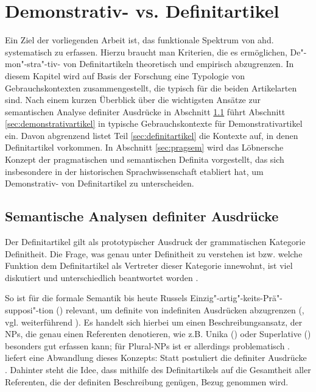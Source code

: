 \chapter{Demonstrativ- vs. Definitartikel}\label{chap:demdef}

Ein Ziel der vorliegenden Arbeit ist, das funktionale Spektrum von ahd.  systematisch zu erfassen. Hierzu braucht man Kriterien, die es ermöglichen, De"-mon"-stra"-tiv- von Definitartikeln theoretisch und empirisch  abzugrenzen. In diesem Kapitel wird auf Basis der Forschung eine Typologie von Gebrauchskontexten zusammengestellt, die typisch für die beiden Artikelarten sind. Nach einem kurzen Überblick über die wichtigsten Ansätze zur semantischen Analyse definiter Ausdrücke in Abschnitt \ref{sec:definitheitstheorien} führt Abschnitt \ref{sec:demonstrativartikel} in typische Gebrauchskontexte für Demonstrativartikel ein. Davon abgrenzend listet Teil \ref{sec:definitartikel} die Kontexte auf, in denen Definitartikel vorkommen. In Abschnitt \ref{sec:pragsem} wird das  Löbnersche Konzept der pragmatischen und semantischen Definita vorgestellt, das sich insbesondere in der historischen Sprachwissenschaft etabliert hat, um Demonstrativ- von Definitartikel zu unterscheiden. 

\section{Semantische Analysen definiter Ausdrücke} \label{sec:definitheitstheorien}

Der Definitartikel gilt als prototypischer Ausdruck der grammatischen Kategorie Definitheit. Die Frage, was genau unter Definitheit zu verstehen ist bzw. welche Funktion dem Definitartikel als Vertreter dieser Kategorie innewohnt, ist viel diskutiert und unterschiedlich beantwortet worden \parencite[zum Überblick  s.][]{Bisle-Muller1991,Hauenschild1993,Lyons1999,Abbott2007,Cui2014}.

So ist für die formale Semantik bis heute Russels Einzig"-artig"-keits-Prä"-supposi"-tion () relevant, um definite von indefiniten Ausdrücken abzugrenzen (\cite{Russel1905}, vgl. weiterführend \cite{Heim1991,Heim2011}). Es handelt sich hierbei um einen Beschreibungsansatz, der NPs, die genau einen Referenten denotieren, wie z.B. Unika () oder Superlative () besonders gut erfassen kann; für  Plural-NPs  ist er allerdings problematisch \parencite[vgl. die Diskussion hierzu in][7--11] {Lyons1999}. \textcite{Hawkins1978} liefert eine Abwandlung dieses Konzepts: Statt  postuliert die  definiter Ausdrücke  \parencite[kritisch hierzu:][32]{Bisle-Muller1991}. Dahinter steht die Idee, dass mithilfe des Definitartikels auf die Gesamtheit aller Referenten, die der definiten Beschreibung genügen, Bezug genommen wird.

